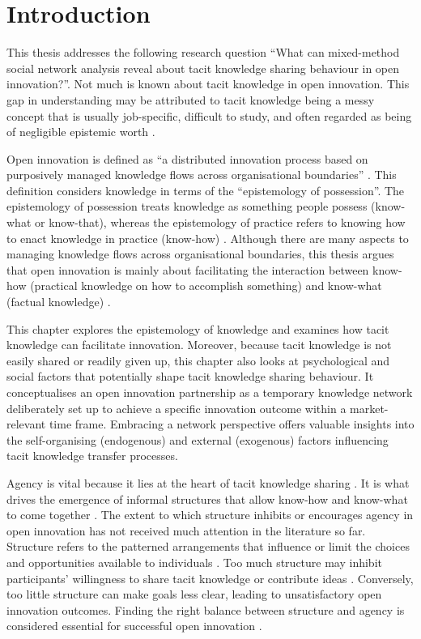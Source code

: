 \section{Introduction}

This thesis addresses the following research question \enquote{What can mixed-method social network analysis reveal about tacit knowledge sharing behaviour in open innovation?}. Not much is known about tacit knowledge in open innovation. This gap in understanding may be attributed to tacit knowledge being a messy concept that is usually job-specific, difficult to study, and often regarded as being of negligible epistemic worth \citep{mohajan2016sharing}. \medskip

Open innovation is defined as \enquote{a distributed innovation process based on purposively managed knowledge flows across organisational boundaries} \citep{chesbrough2014explicating}. This definition considers knowledge in terms of the \enquote{epistemology of possession}. The epistemology of possession treats knowledge as something people possess (know-what or know-that), whereas the epistemology of practice refers to knowing how to enact knowledge in practice (know-how) \citep{cook1999bridging}. Although there are many aspects to managing knowledge flows across organisational boundaries, this thesis argues that open innovation is mainly about facilitating the interaction between know-how (practical knowledge on how to accomplish something) and know-what (factual knowledge) \citep{winter1987knowledge, garud1997distinction}.  \medskip

This chapter explores the epistemology of knowledge and examines how tacit knowledge can facilitate innovation. Moreover, because tacit knowledge is not easily shared or readily given up, this chapter also looks at psychological and social factors that potentially shape tacit knowledge sharing behaviour. It conceptualises an open innovation partnership as a temporary knowledge network deliberately set up to achieve a specific innovation outcome within a market-relevant time frame. Embracing a network perspective offers valuable insights into the self-organising (endogenous) and external (exogenous) factors influencing tacit knowledge transfer processes. \medskip

Agency is vital because it lies at the heart of tacit knowledge sharing \citep{polanyi1966tacit}. It is what drives the emergence of informal structures that allow know-how and know-what to come together \citep{lam2014tacit, hubrich2015embodiment}. The extent to which structure inhibits or encourages agency in open innovation has not received much attention in the literature so far. Structure refers to the patterned arrangements that influence or limit the choices and opportunities available to individuals \citep{bandura1999social}. Too much structure may inhibit participants' willingness to share tacit knowledge or contribute ideas \citep{lam2000tacit}. Conversely, too little structure can make goals less clear, leading to unsatisfactory open innovation outcomes. Finding the right balance between structure and agency is considered essential for successful open innovation \citep{davis2010agency}. \medskip

